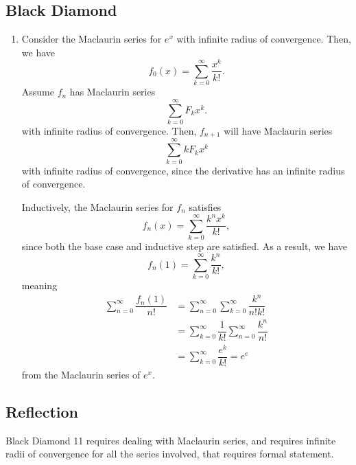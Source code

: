 \documentclass[12pt]{article}
\begin{document}
\subsection{Black Diamond}
\begin{enumerate}
  \item[11] Consider the Maclaurin series for $e^x$ with infinite
    radius of convergence. Then, we have
    $$
    f_0(x) = \sum_{k = 0} ^{\infty} \dfrac{x^k}{k!}.
    $$
    Assume $f_n$ has Maclaurin series  $$
    \sum_{k = 0}^{\infty} F_kx^{k}.
    $$
    with infinite radius of convergence. Then, $f_{n + 1}$ will have
    Maclaurin series
    $$
    \sum_{k = 0}^{\infty} kF_k x^{k}
    $$
    with infinite radius of convergence, since the derivative has an
    infinite radius of convergence.

    Inductively, the Maclaurin series for $f_n$ satisfies
    $$
    f_n(x) = \sum_{k = 0}^{\infty} \dfrac{k^{n} x^{k}}{k!},
    $$
    since both the base case and inductive step are satisfied. As a
    result, we have
    $$
    f_n(1) = \sum_{k = 0}^{\infty} \dfrac{k^n}{k!},
    $$
    meaning
    \begin{align*}
      \sum_{n = 0}^{\infty} \dfrac{f_n(1)}{n!} &= \sum_{n =
      0}^{\infty} \sum_{k = 0}^{\infty} \dfrac{k^n}{n! k!} \\
      &= \sum_{k = 0}^{\infty} \dfrac{1}{k!}\sum_{n = 0}^{\infty}
      \dfrac{k^n}{n!} \\
      &= \sum_{k = 0}^{\infty} \dfrac{e^k}{k!} = e^{e}
    \end{align*}
    from the Maclaurin series of $e^x.$
\end{enumerate}

\subsection{Reflection}
Black Diamond 11 requires dealing with Maclaurin series, and requires
infinite radii of convergence for all the series involved, that
requires formal statement.
\end{document}
